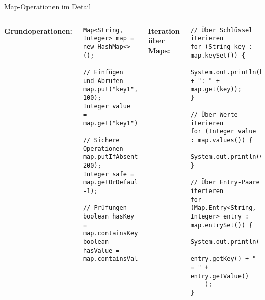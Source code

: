 \begin{frame}[fragile]{Map-Operationen im Detail}
  \begin{columns}[T]
    \textbf{Grundoperationen:}
    \begin{lstlisting}[style=java, basicstyle=\scriptsize\ttfamily]
Map<String, Integer> map = new HashMap<>();

// Einfügen und Abrufen
map.put("key1", 100);
Integer value = map.get("key1");

// Sichere Operationen
map.putIfAbsent("key2", 200);
Integer safe = map.getOrDefault("key3", -1);

// Prüfungen
boolean hasKey = map.containsKey("key1");
boolean hasValue = map.containsValue(100);
    \end{lstlisting}

    \textbf{Iteration über Maps:}
    \begin{lstlisting}[style=java, basicstyle=\scriptsize\ttfamily]
// Über Schlüssel iterieren
for (String key : map.keySet()) {
    System.out.println(key + ": " + map.get(key));
}

// Über Werte iterieren
for (Integer value : map.values()) {
    System.out.println(value);
}

// Über Entry-Paare iterieren
for (Map.Entry<String, Integer> entry : map.entrySet()) {
    System.out.println(
      entry.getKey() + " = " + entry.getValue()
    );
}
    \end{lstlisting}
  \end{columns}
\end{frame}

